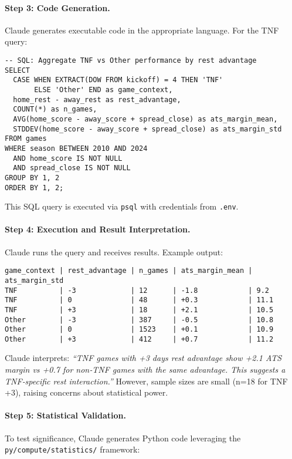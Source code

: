 \paragraph{Step 3: Code Generation.}
Claude generates executable code in the appropriate language. For the TNF query:

\begin{verbatim}
-- SQL: Aggregate TNF vs Other performance by rest advantage
SELECT
  CASE WHEN EXTRACT(DOW FROM kickoff) = 4 THEN 'TNF'
       ELSE 'Other' END as game_context,
  home_rest - away_rest as rest_advantage,
  COUNT(*) as n_games,
  AVG(home_score - away_score + spread_close) as ats_margin_mean,
  STDDEV(home_score - away_score + spread_close) as ats_margin_std
FROM games
WHERE season BETWEEN 2010 AND 2024
  AND home_score IS NOT NULL
  AND spread_close IS NOT NULL
GROUP BY 1, 2
ORDER BY 1, 2;
\end{verbatim}

This SQL query is executed via \texttt{psql} with credentials from \texttt{.env}.

\paragraph{Step 4: Execution and Result Interpretation.}
Claude runs the query and receives results. Example output:
\begin{verbatim}
game_context | rest_advantage | n_games | ats_margin_mean | ats_margin_std
TNF          | -3             | 12      | -1.8            | 9.2
TNF          | 0              | 48      | +0.3            | 11.1
TNF          | +3             | 18      | +2.1            | 10.5
Other        | -3             | 387     | -0.5            | 10.8
Other        | 0              | 1523    | +0.1            | 10.9
Other        | +3             | 412     | +0.7            | 11.2
\end{verbatim}

Claude interprets: \textit{``TNF games with +3 days rest advantage show +2.1 ATS margin vs +0.7 for non‑TNF games with the same advantage. This suggests a TNF‑specific rest interaction.''} However, sample sizes are small (n=18 for TNF +3), raising concerns about statistical power.

\paragraph{Step 5: Statistical Validation.}
To test significance, Claude generates Python code leveraging the \texttt{py/compute/statistics/} framework:


